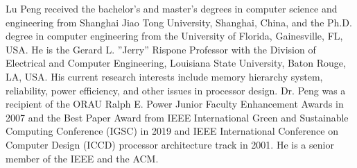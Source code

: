 \documentclass{ieeeaccess}
\begin{document}
\begin{IEEEbiography}{Lu Peng} 
received the bachelor’s and master’s
degrees in computer science and engineering from Shanghai Jiao Tong University, Shanghai,
China, and the Ph.D. degree in computer engineering from the University of Florida,
Gainesville, FL, USA.
He is the Gerard L. ''Jerry'' Rispone Professor with the Division of Electrical and Computer
Engineering, Louisiana State University, Baton Rouge, LA, USA. His current research interests
include memory hierarchy system, reliability, power efficiency, and other issues in processor
design.
Dr. Peng was a recipient of the ORAU Ralph E. Power Junior Faculty Enhancement Awards in 2007
and the Best Paper Award from IEEE International Green and Sustainable Computing Conference
(IGSC) in 2019 and IEEE International Conference on Computer Design (ICCD) processor
architecture track in 2001. He is a senior member of the IEEE and the ACM.
\end{IEEEbiography}


\EOD
\end{document}
